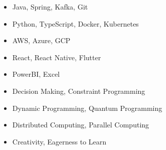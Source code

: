 \documentclass[a4paper,12pt]{memoir} %
\begin{document}

\Sep %




{\begin{itemize}
	\item Java, Spring, Kafka, Git
	\item Python, TypeScript, Docker, Kubernetes
	\item AWS, Azure, GCP
	\item React, React Native, Flutter
	\item PowerBI, Excel
	\item Decision Making, Constraint Programming
	\item Dynamic Programming, Quantum Programming
	\item Distributed Computing, Parallel Computing
	\item Creativity, Eagerness to Learn
\end{itemize}}


\Sep %

\end{document}
